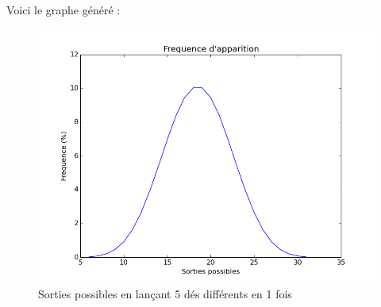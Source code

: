 \documentclass{book}
\begin{document}
Voici le graphe généré : 
\begin{figure}[h!]
	\centering
	\includegraphics[width=\textwidth]{lancer_de_5_des.png}
	\caption{Sorties possibles en lançant 5 dés différents en 1 fois}
\end{figure}
\end{document}
